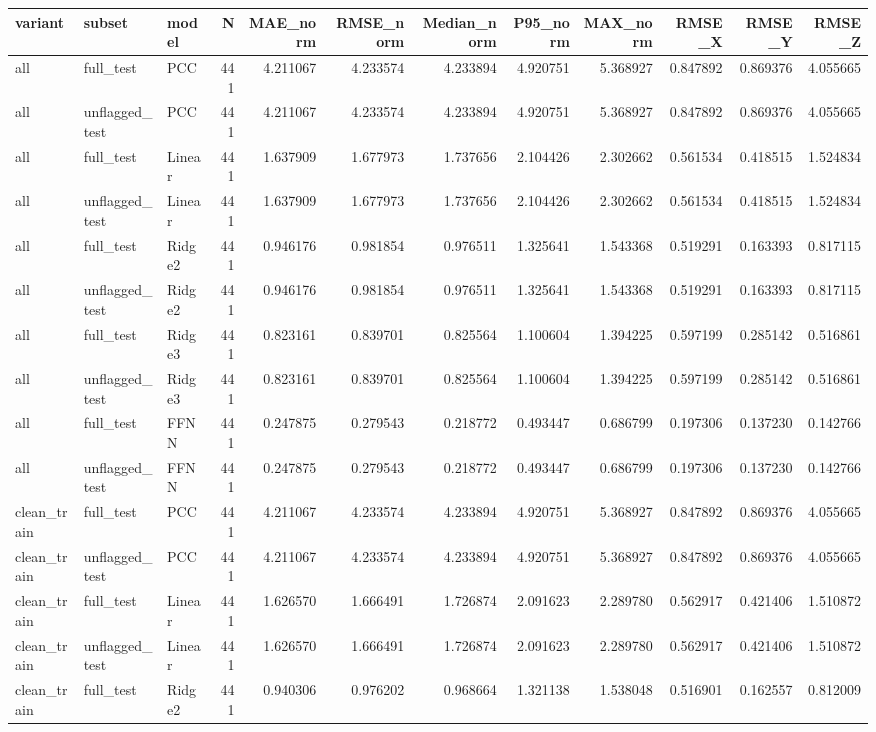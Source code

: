 \begin{tabular}{lllrrrrrrrrr}
\toprule
variant & subset & model & N & MAE_norm & RMSE_norm & Median_norm & P95_norm & MAX_norm & RMSE_X & RMSE_Y & RMSE_Z \\
\midrule
all & full_test & PCC & 441 & 4.211067 & 4.233574 & 4.233894 & 4.920751 & 5.368927 & 0.847892 & 0.869376 & 4.055665 \\
all & unflagged_test & PCC & 441 & 4.211067 & 4.233574 & 4.233894 & 4.920751 & 5.368927 & 0.847892 & 0.869376 & 4.055665 \\
all & full_test & Linear & 441 & 1.637909 & 1.677973 & 1.737656 & 2.104426 & 2.302662 & 0.561534 & 0.418515 & 1.524834 \\
all & unflagged_test & Linear & 441 & 1.637909 & 1.677973 & 1.737656 & 2.104426 & 2.302662 & 0.561534 & 0.418515 & 1.524834 \\
all & full_test & Ridge2 & 441 & 0.946176 & 0.981854 & 0.976511 & 1.325641 & 1.543368 & 0.519291 & 0.163393 & 0.817115 \\
all & unflagged_test & Ridge2 & 441 & 0.946176 & 0.981854 & 0.976511 & 1.325641 & 1.543368 & 0.519291 & 0.163393 & 0.817115 \\
all & full_test & Ridge3 & 441 & 0.823161 & 0.839701 & 0.825564 & 1.100604 & 1.394225 & 0.597199 & 0.285142 & 0.516861 \\
all & unflagged_test & Ridge3 & 441 & 0.823161 & 0.839701 & 0.825564 & 1.100604 & 1.394225 & 0.597199 & 0.285142 & 0.516861 \\
all & full_test & FFNN & 441 & 0.247875 & 0.279543 & 0.218772 & 0.493447 & 0.686799 & 0.197306 & 0.137230 & 0.142766 \\
all & unflagged_test & FFNN & 441 & 0.247875 & 0.279543 & 0.218772 & 0.493447 & 0.686799 & 0.197306 & 0.137230 & 0.142766 \\
clean_train & full_test & PCC & 441 & 4.211067 & 4.233574 & 4.233894 & 4.920751 & 5.368927 & 0.847892 & 0.869376 & 4.055665 \\
clean_train & unflagged_test & PCC & 441 & 4.211067 & 4.233574 & 4.233894 & 4.920751 & 5.368927 & 0.847892 & 0.869376 & 4.055665 \\
clean_train & full_test & Linear & 441 & 1.626570 & 1.666491 & 1.726874 & 2.091623 & 2.289780 & 0.562917 & 0.421406 & 1.510872 \\
clean_train & unflagged_test & Linear & 441 & 1.626570 & 1.666491 & 1.726874 & 2.091623 & 2.289780 & 0.562917 & 0.421406 & 1.510872 \\
clean_train & full_test & Ridge2 & 441 & 0.940306 & 0.976202 & 0.968664 & 1.321138 & 1.538048 & 0.516901 & 0.162557 & 0.812009 \\

\end{tabular}
